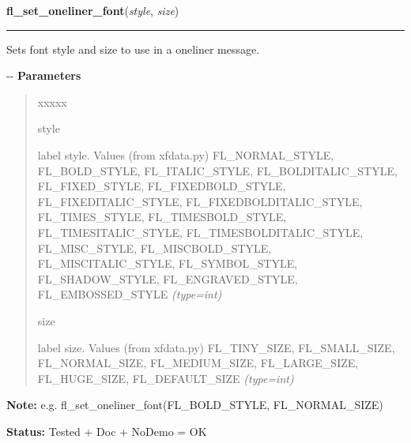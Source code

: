     \label{xformslib:flgoodies:fl_set_oneliner_font}

    \vspace{0.5ex}

\hspace{.8\funcindent}\begin{boxedminipage}{\funcwidth}

    \raggedright \textbf{fl\_set\_oneliner\_font}(\textit{style}, \textit{size})

    \vspace{-1.5ex}

    \rule{\textwidth}{0.5\fboxrule}
\setlength{\parskip}{2ex}

Sets font style and size to use in a oneliner message.

-{}-
\setlength{\parskip}{1ex}
      \textbf{Parameters}
      \vspace{-1ex}

      \begin{quote}
        \begin{Ventry}{xxxxx}

          \item[style]


label style. Values (from xfdata.py) FL\_NORMAL\_STYLE, FL\_BOLD\_STYLE,
FL\_ITALIC\_STYLE, FL\_BOLDITALIC\_STYLE, FL\_FIXED\_STYLE,
FL\_FIXEDBOLD\_STYLE, FL\_FIXEDITALIC\_STYLE, FL\_FIXEDBOLDITALIC\_STYLE,
FL\_TIMES\_STYLE, FL\_TIMESBOLD\_STYLE, FL\_TIMESITALIC\_STYLE,
FL\_TIMESBOLDITALIC\_STYLE, FL\_MISC\_STYLE, FL\_MISCBOLD\_STYLE,
FL\_MISCITALIC\_STYLE, FL\_SYMBOL\_STYLE, FL\_SHADOW\_STYLE,
FL\_ENGRAVED\_STYLE, FL\_EMBOSSED\_STYLE
            {\it (type=int)}

          \item[size]


label size. Values (from xfdata.py) FL\_TINY\_SIZE, FL\_SMALL\_SIZE,
FL\_NORMAL\_SIZE, FL\_MEDIUM\_SIZE, FL\_LARGE\_SIZE, FL\_HUGE\_SIZE,
FL\_DEFAULT\_SIZE
            {\it (type=int)}

        \end{Ventry}

      \end{quote}

\textbf{Note:} 
e.g. fl\_set\_oneliner\_font(FL\_BOLD\_STYLE, FL\_NORMAL\_SIZE)


\textbf{Status:} 
Tested + Doc + NoDemo = OK


    \end{boxedminipage}

